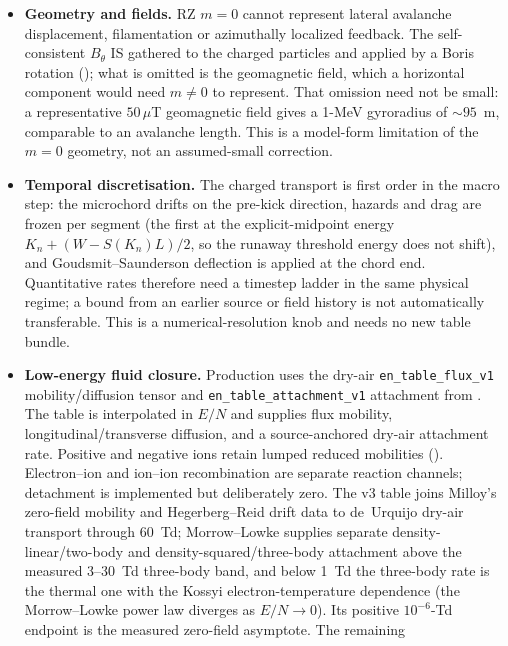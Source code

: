 \documentclass[11pt]{article}
\DeclareRobustCommand{\code}[1]{\ifmmode\text{\ttfamily#1}\else\nolinkurl{#1}\fi}
\begin{document}
\begin{itemize}
  \item \textbf{Geometry and fields.} RZ $m=0$ cannot represent lateral
    avalanche displacement, filamentation or azimuthally localized
    feedback. The self-consistent $B_\theta$ IS gathered to the charged
    particles and applied by a Boris rotation
    (); what is omitted is the geomagnetic
    field, which a horizontal component would need $m\neq0$ to represent.
    That omission need not be small: a representative $50\,\mu$T geomagnetic
    field gives a 1-MeV gyroradius of ${\sim}95$~m, comparable to an avalanche
    length. This is
    a model-form limitation of the $m=0$ geometry, not an assumed-small
    correction.
  \item \textbf{Temporal discretisation.}  The charged transport is
    first order in the macro step: the microchord drifts on the
    pre-kick direction, hazards and drag are frozen per segment (the first
    at the explicit-midpoint energy $K_n+(W-S(K_n)L)/2$, so the runaway
    threshold energy does not shift), and
    Goudsmit--Saunderson deflection is applied at the chord end. Quantitative
    rates therefore need a timestep ladder in the same physical regime; a
    bound from an earlier source or field history is not automatically
    transferable. This is a numerical-resolution knob and needs no new table
    bundle.
  \item \textbf{Low-energy fluid closure.} Production uses the dry-air
    \code{en\_table\_flux\_v1} mobility/diffusion tensor and
    \code{en\_table\_attachment\_v1} attachment from
    . The table is
    interpolated in $E/N$ and supplies flux mobility, longitudinal/transverse
    diffusion, and a source-anchored dry-air attachment rate. Positive and negative
    ions retain lumped reduced mobilities ().
    Electron--ion and ion--ion recombination are separate reaction channels;
    detachment is implemented but deliberately zero. The v3 table joins
    Milloy's zero-field mobility and Hegerberg--Reid drift data to de~Urquijo
    dry-air transport through 60~Td; Morrow--Lowke supplies separate
    density-linear/two-body and density-squared/three-body attachment above
    the measured 3--30~Td three-body band, and below 1~Td the three-body rate
    is the thermal one with the Kossyi electron-temperature dependence (the
    Morrow--Lowke power law diverges as $E/N\to0$). Its positive
    $10^{-6}$-Td endpoint is the measured zero-field asymptote. The remaining

\end{itemize}
\end{document}
